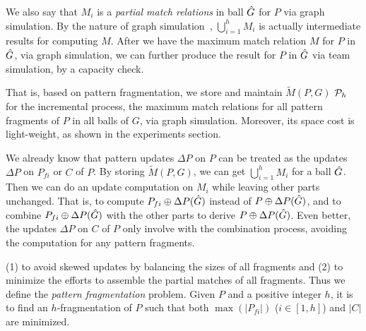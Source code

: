 We also say that $M_i$ is a {\em partial match relations} in ball $\hat{G}{}$ for $P$ via graph simulation.
By the nature of graph simulation~\cite{infsimu95}, $\bigcup_{i=1}^{h}M_{i}$ is actually intermediate results for computing $M$.
After we have the maximum match relation $M$ for $P$ in $\hat{G}{}$, via graph simulation, we can further produce the result for $P$ in  $\hat{G}{}$ via team simulation, by a capacity check.

That is, based on pattern fragmentation, we store and maintain $\tilde{M}(P,G)$ \wrt ${\cal P}_{h}$ for the incremental process,
\ie the maximum match relations for all pattern fragments of $P$ in all balls of $G$, via graph simulation.
Moreover, its space cost is light-weight, as shown in the experiments section.



We already know that pattern updates $\Delta P$ on $P$ can be treated as the updates $\Delta P$ on $P_{fi}$ or $C$ of $P$.
By storing $\tilde{M}(P,G)$, we can get $\bigcup_{i=1}^{h}M_{i}$ for a ball $\hat{G}{}$.
Then we can do an update computation on $M_i$ while leaving other parts unchanged. That is, to compute $P_{fi}\oplus\Delta P(\hat{G}{})$ instead of $P\oplus\Delta P(\hat{G}{})$, and to combine $P_{fi}\oplus\Delta P(\hat{G}{})$ with the other parts to derive $P\oplus\Delta P(\hat{G}{})$.
Even better, the updates $\Delta P$ on $C$ of $P$ only involve with the combination process, avoiding the computation for any pattern fragments.

\vspace{0.8ex}
 (1) to avoid skewed updates by balancing the sizes of all fragments and (2) to minimize the efforts to assemble the partial matches of all fragments.
Thus we define the {\em pattern fragmentation} problem. Given $P$ and a positive integer $h$, it is to find
an $h$-fragmentation of $P$ such that both $\max(|P_{fi}|)$ ($i\in[1,h]$) and $|C|$ are minimized. 

